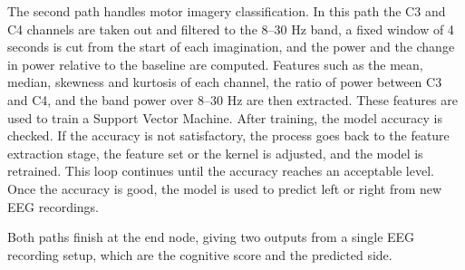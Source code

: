 The second path handles motor imagery classification. In this path the C3 and C4 channels
are taken out and filtered to the 8--30 Hz band, a fixed window of 4 seconds is cut from
the start of each imagination, and the power and the change in power relative to the
baseline are computed. Features such as the mean, median, skewness and kurtosis of each
channel, the ratio of power between C3 and C4, and the band power over 8--30 Hz are then
extracted. These features are used to train a Support Vector Machine. After training, the
model accuracy is checked. If the accuracy is not satisfactory, the process goes back to
the feature extraction stage, the feature set or the kernel is adjusted, and the model is
retrained. This loop continues until the accuracy reaches an acceptable level. Once the
accuracy is good, the model is used to predict left or right from new EEG recordings.

Both paths finish at the end node, giving two outputs from a single EEG recording setup,
which are the cognitive score and the predicted side.